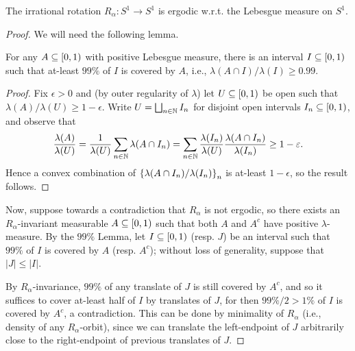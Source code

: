 \documentclass[reqno, twoside]{article}
\begin{document}
    \begin{proposition}\label{prp:irrational_rotation_ergodic}
        The irrational rotation $R_\alpha:S^1\to S^1$ is ergodic w.r.t. the Lebesgue measure on $S^1$.
    \end{proposition}
    \begin{proof}
        We will need the following lemma.
        \begin{center}
            \begin{minipage}{0.95\textwidth}
                \begin{lemma}\label{99_lebesgue}
                    For any $A\subseteq[0,1)$ with positive Lebesgue measure, there is an interval $I\subseteq[0,1)$ such that at-least $99\%$ of $I$ is covered by $A$, i.e., $\lambda(A\cap I)/\lambda(I)\geq0.99$.
                \end{lemma}
                \begin{proof}
                    Fix $\epsilon>0$ and (by outer regularity of $\lambda$) let $U\subseteq[0,1)$ be open such that $\lambda(A)/\lambda(U)\geq1-\epsilon$. Write $U=\bigsqcup_{n\in\mathbb{N}}I_n$ for disjoint open intervals $I_n\subseteq[0,1)$, and observe that
                    \vspace{-0.05in}
                    \begin{equation*}
                        \frac{\lambda(A)}{\lambda(U)}=\frac{1}{\lambda(U)}\sum_{n\in\N}\lambda(A\cap I_n)=\sum_{n\in\N}\frac{\lambda(I_n)}{\lambda(U)}\frac{\lambda(A\cap I_n)}{\lambda(I_n)}\geq1-\epsilon.
                        \vspace{-0.05in}
                    \end{equation*}
                    Hence a convex combination of $\left\{\lambda(A\cap I_n)/\lambda(I_n)\right\}_n$ is at-least $1-\epsilon$, so the result follows. \qedlem
                \end{proof}
            \end{minipage}
        \end{center}
        Now, suppose towards a contradiction that $R_\alpha$ is not ergodic, so there exists an $R_\alpha$-invariant measurable $A\subseteq[0,1)$ such that both $A$ and $A^c$ have positive $\lambda$-measure. By the $99\%$ Lemma, let $I\subseteq[0,1)$ (resp. $J$) be an interval such that $99\%$ of $I$ is covered by $A$ (resp. $A^c$); without loss of generality, suppose that $|J|\leq|I|$.

        By $R_\alpha$-invariance, $99\%$ of any translate of $J$ is still covered by $A^c$, and so it suffices to cover at-least half of $I$ by translates of $J$, for then $99\%/2>1\%$ of $I$ is covered by $A^c$, a contradiction. This can be done by minimality of $R_\alpha$ (i.e., density of any $R_\alpha$-orbit), since we can translate the left-endpoint of $J$ arbitrarily close to the right-endpoint of previous translates of $J$.
    \end{proof}
\end{document}
